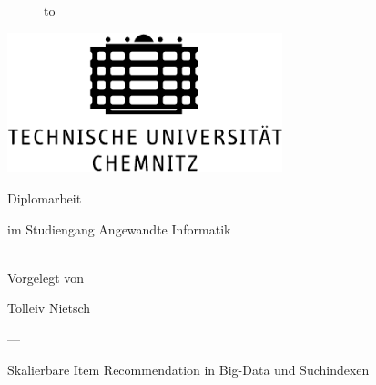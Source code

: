 \begin{titlepage}
\begin{figure}
  \begin{center}
    \hbox to 
  \end{center}
\end{figure}

\begin{center}
\rule{0pt}{0pt}
\vfill
\vfill
\includegraphics[width=8cm]{Abbildungen/TUC_deutsch_SW.pdf}
\vfill
\vfill
\vfill
\vfill

\begin{Huge}
Diplomarbeit \\
\end{Huge}
im Studiengang Angewandte Informatik \\
~\\
\begin{footnotesize}
Vorgelegt von \\
\end{footnotesize}
\begin{large}
Tolleiv Nietsch \\
\end{large}
\begin{footnotesize}
--- \\
\end{footnotesize}

\vfill
\vfill

\begin{large}Skalierbare Item Recommendation in Big-Data und Suchindexen\end{large} \\


\vfill

\end{center}
\end{titlepage}

